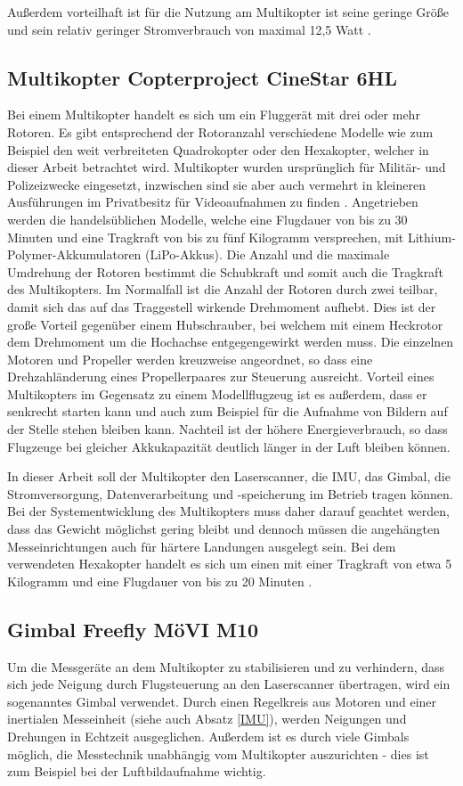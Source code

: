 \documentclass[a4paper,12pt,bibliography=totoc, listof=totoc,titlepage]{scrreprt}
\begin{document}
Außerdem vorteilhaft ist für die Nutzung am Multikopter ist seine geringe 
Größe und sein relativ geringer Stromverbrauch von maximal 12,5 
Watt \citep{raspSheet}.

\subsection{Multikopter Copterproject CineStar 6HL}
Bei einem Multikopter handelt es sich um ein Fluggerät mit drei oder mehr Rotoren. Es gibt entsprechend der Rotoranzahl verschiedene Modelle wie zum Beispiel den weit verbreiteten Quadrokopter oder den Hexakopter, welcher in dieser Arbeit betrachtet wird. Multikopter wurden ursprünglich für Militär- und Polizeizwecke eingesetzt, inzwischen sind sie aber auch vermehrt in kleineren Ausführungen im Privatbesitz für Videoaufnahmen zu finden \citep{Quadro}. Angetrieben werden die handelsüblichen Modelle, welche eine Flugdauer von bis zu 30 Minuten und eine Tragkraft von bis zu fünf Kilogramm versprechen, mit Lithium-Polymer-Akkumulatoren (LiPo-Akkus). Die Anzahl und die maximale Umdrehung der Rotoren bestimmt die Schubkraft und somit auch die Tragkraft des Multikopters. Im Normalfall ist die Anzahl der Rotoren durch zwei teilbar, damit sich das auf das Traggestell wirkende Drehmoment aufhebt. Dies ist der große Vorteil gegenüber einem Hubschrauber, bei welchem mit einem Heckrotor dem Drehmoment um die Hochachse entgegengewirkt werden muss. Die einzelnen Motoren und Propeller werden kreuzweise angeordnet, so dass eine Drehzahländerung eines Propellerpaares zur Steuerung ausreicht. Vorteil eines Multikopters im Gegensatz zu einem Modellflugzeug ist es außerdem, dass er senkrecht starten kann und auch zum Beispiel für die Aufnahme von Bildern auf der Stelle stehen bleiben kann. Nachteil ist der höhere Energieverbrauch, so dass Flugzeuge bei gleicher Akkukapazität deutlich länger in der Luft bleiben können. \citep{Bachfeld}

In dieser Arbeit soll der Multikopter den Laserscanner, die IMU, das Gimbal, die Stromversorgung, Datenverarbeitung und -speicherung im Betrieb tragen können. Bei der Systementwicklung des Multikopters muss daher darauf geachtet werden, dass das Gewicht möglichst gering bleibt und dennoch müssen die angehängten Messeinrichtungen auch für härtere Landungen ausgelegt sein. Bei dem  verwendeten Hexakopter handelt es sich um einen  mit einer Tragkraft von etwa 5 Kilogramm und eine Flugdauer von bis zu 20 Minuten \citep{Schulz}.

\subsection{Gimbal Freefly MöVI M10}
Um die Messgeräte an dem Multikopter zu stabilisieren und zu verhindern, dass sich jede Neigung durch Flugsteuerung an den Laserscanner übertragen, wird ein sogenanntes Gimbal verwendet. Durch einen Regelkreis aus Motoren und einer inertialen Messeinheit (siehe auch Absatz \ref{IMU}), werden Neigungen und Drehungen in Echtzeit ausgeglichen. Außerdem ist es durch viele Gimbals möglich, die Messtechnik unabhängig vom Multikopter auszurichten - dies ist zum Beispiel bei der Luftbildaufnahme wichtig.
\end{document}
